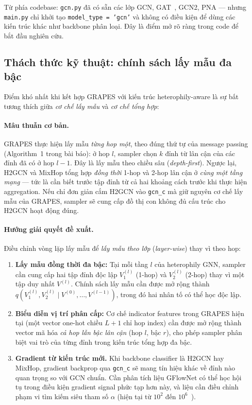 Từ phía codebase: \texttt{gcn.py} đã có sẵn các lớp GCN, GAT~\cite{Velickovic2018}, GCN2, PNA --- nhưng \texttt{main.py} chỉ khởi tạo \texttt{model\_type = 'gcn'} và không có điều kiện để dùng các kiến trúc khác như backbone phân loại. Đây là điểm mở rõ ràng trong code để bắt đầu nghiên cứu.

\subsection{Thách thức kỹ thuật: chính sách lấy mẫu đa bậc}

Điểm khó nhất khi kết hợp GRAPES với kiến trúc heterophily-aware là sự bất tương thích giữa \textit{cơ chế lấy mẫu} và \textit{cơ chế tổng hợp}:

\paragraph{Mâu thuẫn cơ bản.}
GRAPES thực hiện lấy mẫu \textit{từng hop một}, theo đúng thứ tự của message passing (Algorithm~1 trong bài báo): ở hop $l$, sampler chọn $k$ đỉnh từ lân cận của các đỉnh đã có ở hop $l-1$. Đây là lấy mẫu theo chiều sâu (\textit{depth-first}). Ngược lại, H2GCN và MixHop tổng hợp \textit{đồng thời} 1-hop và 2-hop lân cận ở \textit{cùng một tầng mạng} --- tức là cần biết trước tập đỉnh từ cả hai khoảng cách trước khi thực hiện aggregation. Nếu chỉ đơn giản cắm H2GCN vào \texttt{gcn\_c} mà giữ nguyên cơ chế lấy mẫu của GRAPES, sampler sẽ cung cấp đồ thị con không đủ cấu trúc cho H2GCN hoạt động đúng.

\paragraph{Hướng giải quyết đề xuất.}
Điều chỉnh vòng lặp lấy mẫu để \textit{lấy mẫu theo lớp} (\textit{layer-wise}) thay vì theo hop:

\begin{enumerate}
    \item \textbf{Lấy mẫu đồng thời đa bậc:} Tại mỗi tầng $l$ của heterophily GNN, sampler cần cung cấp hai tập đỉnh độc lập $V^{(l)}_1$ (1-hop) và $V^{(l)}_2$ (2-hop) thay vì một tập duy nhất $V^{(l)}$. Chính sách lấy mẫu cần được mở rộng thành $q(V^{(l)}_1, V^{(l)}_2 \mid V^{(0)}, \ldots, V^{(l-1)})$, trong đó hai nhân tố có thể học độc lập.

    \item \textbf{Biểu diễn vị trí phân cấp:} Cơ chế indicator features trong GRAPES hiện tại (một vector one-hot chiều $L+1$ chỉ hop index) cần được mở rộng thành vector mã hóa \textit{cả hop lẫn bậc lân cận} (hop $l$, bậc $r$), cho phép sampler phân biệt vai trò của từng đỉnh trong kiến trúc tổng hợp đa bậc.

    \item \textbf{Gradient từ kiến trúc mới.} Khi backbone classifier là H2GCN hay MixHop, gradient backprop qua \texttt{gcn\_c} sẽ mang tín hiệu khác về đỉnh nào quan trọng so với GCN chuẩn. Cần phân tích liệu GFlowNet có thể học hội tụ trong điều kiện gradient signal phức tạp hơn này, và liệu cần điều chỉnh phạm vi tìm kiếm siêu tham số $\alpha$ (hiện tại từ $10^2$ đến $10^6$~\cite{Younesian2023GRAPES}).
\end{enumerate}

